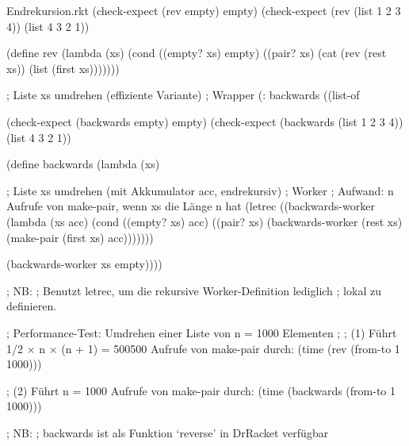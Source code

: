 \begin{filecontents*}{Endrekursion.rkt}
(check-expect (rev empty) empty)
(check-expect (rev (list 1 2 3 4)) (list 4 3 2 1))

(define rev
  (lambda (xs)
    (cond ((empty? xs) empty)
          ((pair? xs) 
           (cat (rev (rest xs)) (list (first xs)))))))


; Liste xs umdrehen (effiziente Variante)
; Wrapper
(: backwards ((list-of %

(check-expect (backwards empty) empty)
(check-expect (backwards (list 1 2 3 4)) (list 4 3 2 1))

(define backwards
  (lambda (xs)
    
    ; Liste xs umdrehen (mit Akkumulator acc, endrekursiv)
    ; Worker
    ; Aufwand: n Aufrufe von make-pair, wenn xs die Länge n hat
    (letrec ((backwards-worker
              (lambda (xs acc)
                (cond ((empty? xs) acc)
                      ((pair? xs) 
                       (backwards-worker (rest xs) (make-pair (first xs) acc)))))))
      
      (backwards-worker xs empty))))

; NB:
; Benutzt letrec, um die rekursive Worker-Definition lediglich
; lokal zu definieren.


; Performance-Test: Umdrehen einer Liste von n = 1000 Elementen
;
; (1) Führt 1/2 × n × (n + 1) = 500500 Aufrufe von make-pair durch:
(time (rev (from-to 1 1000)))

; (2) Führt n = 1000 Aufrufe von make-pair durch:
(time (backwards (from-to 1 1000)))


; NB:
; backwards ist als Funktion `reverse' in DrRacket verfügbar
\end{filecontents*}